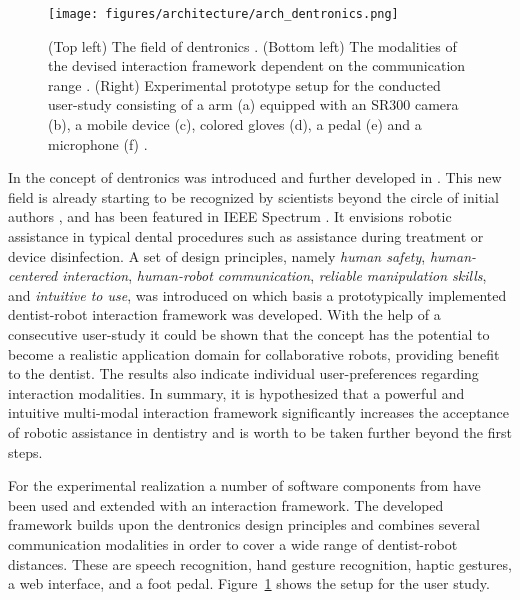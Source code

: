 \begin{figure}[ht!]
\texttt{[image: figures/architecture/arch\_dentronics.png]}
\caption{(Top left) The field of dentronics \cite{Grischke.2020}. (Bottom left) The modalities of the devised interaction framework dependent on the communication range \cite{Grischke.2019}. (Right) Experimental prototype setup for the conducted user-study consisting of a \platformname{} arm \cite{Haddadin.2022} (a) equipped with an SR300 camera \cite{keselman2017intel} (b), a mobile device (c), colored gloves (d), a pedal (e) and a microphone (f) \cite{Grischke.2019}.}
\label{fig:architecture:system:dentronics:setup}
\end{figure}

In \cite{Grischke.2019} the concept of dentronics was introduced and further developed in \cite{Grischke.2020,monnink2023dentronics}.
This new field is already starting to be recognized by scientists beyond the circle of initial authors \cite{jayaweera2021reshaping}, and has been featured in IEEE Spectrum \cite{spectrum2019dentronics}.
It envisions robotic assistance in typical dental procedures such as assistance during treatment or device disinfection.
A set of design principles, namely \emph{human safety}, \emph{human-centered interaction}, \emph{human-robot communication}, \emph{reliable manipulation skills}, and \emph{intuitive to use}, was introduced on which basis a prototypically implemented dentist-robot interaction framework was developed.
With the help of a consecutive user-study it could be shown that the concept has the potential to become a realistic application domain for collaborative robots, providing benefit to the dentist.
The results also indicate individual user-preferences regarding interaction modalities. 
In summary, it is hypothesized that a powerful and intuitive multi-modal interaction framework significantly increases the acceptance of robotic assistance in dentistry and is worth to be taken further beyond the first steps.

For the experimental realization a number of software components from \softwareabbr{} have been used and extended with an interaction framework.
The developed framework builds upon the dentronics design principles and combines several communication modalities in order to cover a wide range of dentist-robot distances.
These are speech recognition, hand gesture recognition, haptic gestures, a web interface, and a foot pedal.
Figure~\ref{fig:architecture:system:dentronics:setup} shows the setup for the user study.

